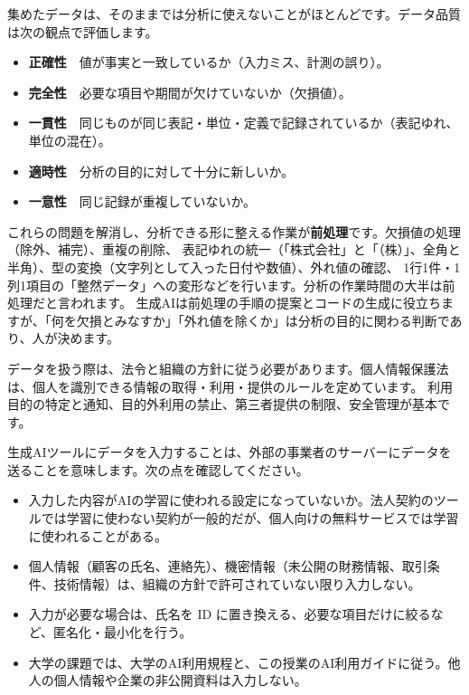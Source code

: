 集めたデータは、そのままでは分析に使えないことがほとんどです。データ品質は次の観点で評価します。
\begin{itemize}
  \item \textbf{正確性}　値が事実と一致しているか（入力ミス、計測の誤り）。
  \item \textbf{完全性}　必要な項目や期間が欠けていないか（欠損値）。
  \item \textbf{一貫性}　同じものが同じ表記・単位・定義で記録されているか（表記ゆれ、単位の混在）。
  \item \textbf{適時性}　分析の目的に対して十分に新しいか。
  \item \textbf{一意性}　同じ記録が重複していないか。
\end{itemize}
これらの問題を解消し、分析できる形に整える作業が\textbf{前処理}です。欠損値の処理（除外、補完）、重複の削除、
表記ゆれの統一（「株式会社」と「（株）」、全角と半角）、型の変換（文字列として入った日付や数値）、外れ値の確認、
1行1件・1列1項目の「整然データ」への変形などを行います。分析の作業時間の大半は前処理だと言われます。
生成AIは前処理の手順の提案とコードの生成に役立ちますが、「何を欠損とみなすか」「外れ値を除くか」は分析の目的に関わる判断であり、人が決めます。

データを扱う際は、法令と組織の方針に従う必要があります。個人情報保護法は、個人を識別できる情報の取得・利用・提供のルールを定めています。
利用目的の特定と通知、目的外利用の禁止、第三者提供の制限、安全管理が基本です。

生成AIツールにデータを入力することは、外部の事業者のサーバーにデータを送ることを意味します。次の点を確認してください。
\begin{itemize}
  \item 入力した内容がAIの学習に使われる設定になっていないか。法人契約のツールでは学習に使わない契約が一般的だが、個人向けの無料サービスでは学習に使われることがある。
  \item 個人情報（顧客の氏名、連絡先）、機密情報（未公開の財務情報、取引条件、技術情報）は、組織の方針で許可されていない限り入力しない。
  \item 入力が必要な場合は、氏名を ID に置き換える、必要な項目だけに絞るなど、匿名化・最小化を行う。
  \item 大学の課題では、大学のAI利用規程と、この授業のAI利用ガイドに従う。他人の個人情報や企業の非公開資料は入力しない。
\end{itemize}

